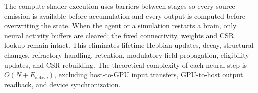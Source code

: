 \documentclass[12pt,a4paper]{article}
\begin{document}
The compute-shader execution uses barriers between stages so every source emission is available before accumulation and every output is computed before overwriting the state. When the agent or a simulation restarts a brain, only neural activity buffers are cleared; the fixed connectivity, weights and CSR lookup remain intact. This eliminates lifetime Hebbian updates, decay, structural changes, refractory handling, retention, modulatory-field propagation, eligibility updates, and CSR rebuilding. The theoretical complexity of each neural step is $O(N+E_{\mathrm{active}})$, excluding host-to-GPU input transfers, GPU-to-host output readback, and device synchronization.
\end{document}
